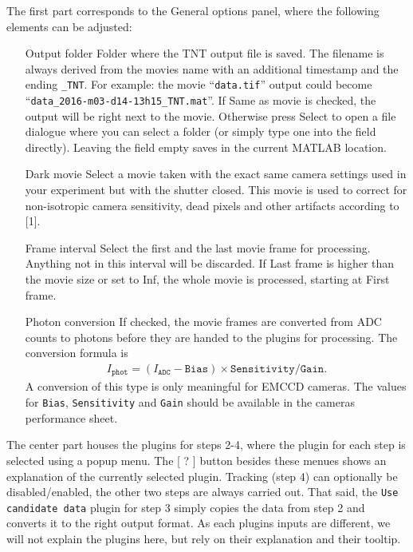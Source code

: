 \documentclass[11pt,onside]{report}
\numberwithin{equation}{chapter}
\begin{document}
The first part corresponds to the \textsf{General options} panel, where the following elements can be adjusted:
\begin{itemize}[leftmargin=3.5cm]
\item[Output folder] Folder where the TNT output file is saved. The filename is always derived from the movies name with an additional timestamp and the ending \texttt{\_TNT}. For example: the movie ``\texttt{data.tif}'' output could become ``\texttt{data\_2016-m03-d14-13h15\_TNT.mat}''. If \textsf{Same as movie} is checked, the output will be right next to the movie. Otherwise press \textsf{Select} to open a file dialogue where you can select a folder (or simply type one into the field directly). Leaving the field empty saves in the current MATLAB location.
\item[Dark movie] Select a movie taken with the exact same camera settings used in your experiment but with the shutter closed. This movie is used to correct for non-isotropic camera sensitivity, dead pixels and other artifacts according to [1].
\item[Frame interval] Select the first and the last movie frame for processing. Anything not in this interval will be discarded. If \textsf{Last frame} is higher than the movie size or set to \textsf{Inf}, the whole movie is processed, starting at \textsf{First frame}.
\item[Photon conversion]  If checked, the movie frames are converted from ADC counts to photons before they are handed to the plugins for processing. The conversion formula is
\begin{align}
I_{\texttt{phot}} = (I_{\texttt{ADC}}-\texttt{Bias})\times\texttt{Sensitivity}/\texttt{Gain}.
\end{align}
A conversion of this type is only meaningful for EMCCD cameras. The values for \texttt{Bias}, \texttt{Sensitivity} and \texttt{Gain} should be available in the cameras performance sheet.
\end{itemize}

The center part houses the plugins for steps 2-4, where the plugin for each step is selected using a popup menu. The [ \textsf{?} ] button besides these menues shows an explanation of the currently selected plugin. Tracking (step 4) can optionally be disabled/enabled, the other two steps are always carried out. That said, the \texttt{Use candidate data} plugin for step 3 simply copies the data from step 2 and converts it to the right output format. As each plugins inputs are different, we will not explain the plugins here, but rely on their explanation and their tooltip.\\
\end{document}
